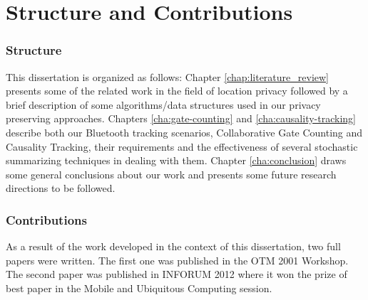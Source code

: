 \section{Structure and Contributions}
\label{sec:structure}

\subsubsection{Structure}
\label{sec:structure} This dissertation is organized as follows:
Chapter \ref{chap:literature_review} presents some of the related work
in the field of location privacy followed by a brief description of
some algorithms/data structures used in our privacy preserving
approaches. Chapters \ref{cha:gate-counting} and
\ref{cha:causality-tracking} describe both our Bluetooth tracking
scenarios, Collaborative Gate Counting and Causality Tracking, their
requirements and the effectiveness of several stochastic summarizing
techniques in dealing with them. Chapter \ref{cha:conclusion} draws
some general conclusions about our work and presents some future
research directions to be followed.

\subsubsection{Contributions}
\label{sec:contributions}
As a result of the work developed in the context of this
dissertation, two full papers were written. The first one
\cite{gonccalves2011privacy} was published in the OTM 2001 Workshop.
The second paper \cite{inforum2012} was published in INFORUM 2012
where it won the prize of best paper in the Mobile and Ubiquitous
Computing session.

